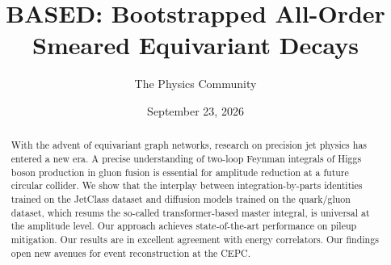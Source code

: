 \documentclass[11pt]{article}
\title{BASED: Bootstrapped All-Order Smeared Equivariant Decays}
\author{The Physics Community}
\date{September 23, 2026}
\numberwithin{equation}{section}
\theoremstyle{definition}
\theoremstyle{remark}
\begin{document}
\maketitle
\begin{abstract}
With the advent of equivariant graph networks, research on precision jet
physics has entered a new era. A precise understanding of two-loop
Feynman integrals of Higgs boson production in gluon fusion is essential
for amplitude reduction at a future circular collider. We show that the
interplay between integration-by-parts identities trained on the
JetClass dataset and diffusion models trained on the quark/gluon
dataset, which resums the so-called transformer-based master integral,
is universal at the amplitude level. Our approach achieves
state-of-the-art performance on pileup mitigation. Our results are in
excellent agreement with energy correlators. Our findings open new
avenues for event reconstruction at the CEPC.
\end{abstract}
\tableofcontents



\nocite{*}


\end{document}
